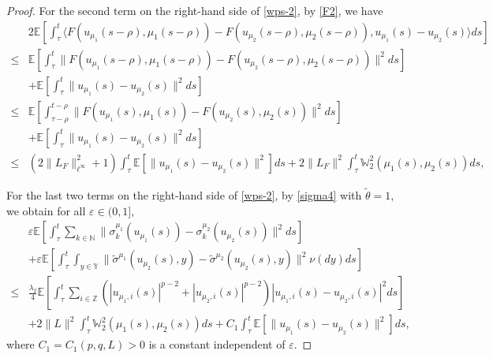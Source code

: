 \documentclass[11pt]{article}
\numberwithin{equation}{section}
\theoremstyle{plain}
\begin{document}
\begin{proof}
 For the second term on the right-hand side of \eqref{wps-2},
 by \eqref{F2}, we have
 \begin{align} \label{wps-4}
       & 2 \mathbb{E}
                \left[ \int_{\tau}^{t}
                          \langle F( u_{\mu_1}(s-\rho),  {\mu_1}(s-\rho) ) - F( u_{\mu_2}(s-\rho),  {\mu_2}(s-\rho) ),
                                  u_{\mu_1}(s) - u_{\mu_2}(s)
                          \rangle ds
                \right]  \nonumber\\
  \le & \mathbb{E}
                \left[ \int_{\tau}^{t}
                          \| F( u_{\mu_1}(s-\rho),  {\mu_1}(s-\rho) ) - F( u_{\mu_2}(s-\rho), 
                          {\mu_2}(s-\rho) ) \|^2 ds
                \right]  \nonumber \\
        & + \mathbb{E}
              \left[ \int_{\tau}^{t} \| u_{\mu_1}(s) - u_{\mu_2}(s) \|^2 ds
              \right]  \nonumber \\
    \le & \mathbb{E}
                \left[ \int_{\tau-\rho}^{t-\rho}
                          \| F( u_{\mu_1}(s),  {\mu_1}(s) ) - F( u_{\mu_2}(s),  {\mu_2}(s) ) \|^2 ds
                \right]  \nonumber \\
         & + \mathbb{E}
              \left[ \int_{\tau}^{t} \| u_{\mu_1}(s) - u_{\mu_2}(s) \|^2 ds
              \right]  \nonumber\\
  \le & \left( 2 \|L_{F}\|_{\ell^\infty}^2 +1 \right)
            \int_{\tau}^{t}
               \mathbb{E}
                  \left[ \| u_{\mu_1}(s) - u_{\mu_2}(s) \|^2 \right]
            ds
          + 2 \|L_{F}\|^2 \int_{\tau}^{t} \mathbb{W}_2^2(\mu_1(s),\mu_2(s) ) ds,
 \end{align}

 For the last two terms on the right-hand side of \eqref{wps-2},
 by \eqref{sigma4} with $\tilde{\theta}=1$, we obtain for all $\varepsilon \in (0,1]$,
\begin{align}\label{wps-5}
       & \varepsilon\mathbb{E}
            \left[ \int_{\tau}^{t} \sum_{k \in \mathbb{N}}
                      \| \sigma^{\mu_1}_k(u_{\mu_1}(s))
                         - \sigma^{\mu_2}_k(u_{\mu_2}(s)) \|^2 ds
            \right]  \nonumber \\
       & + \varepsilon \mathbb{E}
              \left[ \int_{\tau}^{t} 
                     \int_{y\in\mathbb{Y} }
                           \| \widetilde{\sigma}^{\mu_1}(u_{\mu_2}(s),y) - \widetilde{\sigma}^{\mu_2} (u_{\mu_2}(s),y) \|^2  \nu(dy)ds
              \right]  \nonumber \\
  \le & \frac{\lambda_2}{4}
         \mathbb{E}
            \left[ \int_{\tau}^{t} \sum_{i \in \mathbb{Z}}
                         \left( |u_{\mu_1,i}(s)|^{p-2} + |u_{\mu_2,i}(s) |^{p-2} \right)
                         |u_{\mu_1,i}(s) - u_{\mu_2,i}(s)|^2 ds
            \right]  \nonumber\\
       & + 2 \|L\|^2 \int_{\tau}^{t} \mathbb{W}^2_2(\mu_1(s),\mu_2(s) ) ds
         + C_1
             \int_{\tau}^{t}
                \mathbb{E} \left[ \|u_{\mu_1}(s) - u_{\mu_2}(s) \|^2 \right] ds,
\end{align}
where $C_1=C_1(p,q, L)>0$ is a constant
independent of $\varepsilon$.


\end{proof}
\end{document}

